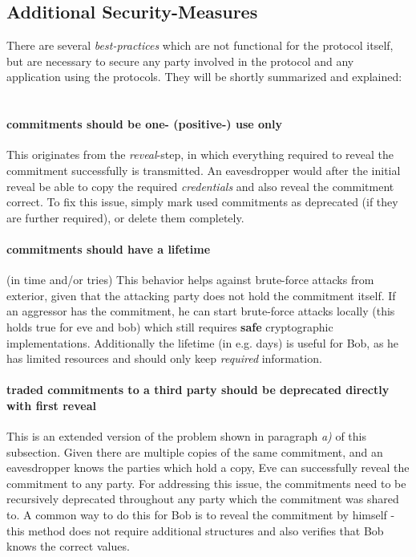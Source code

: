 \documentclass[conference]{IEEEtran}
\begin{document}
\subsection{Additional Security-Measures}
There are several \textit{best-practices} which are not functional for the protocol itself, but are necessary to secure any party involved in the protocol and any application using the protocols. They will be shortly summarized and explained: ~\newline

	\paragraph{commitments should be one- (positive-) use only} This originates from the \textit{reveal}-step, in which everything required to reveal the commitment successfully is transmitted. An eavesdropper would after the initial reveal be able to copy the required \textit{credentials} and also reveal the commitment correct.  To fix this issue, simply mark used commitments as deprecated (if they are further required), or delete them completely. 
	\paragraph{commitments should have a lifetime} (in time and/or tries)
	This behavior helps against brute-force attacks from exterior, given that the attacking party does not hold the commitment itself. If an aggressor has the commitment, he can start brute-force attacks locally (this holds true for eve and bob) which still requires \textbf{safe} cryptographic implementations.
	Additionally the lifetime (in e.g. days) is useful for Bob, as he has limited resources and should only keep \textit{required} information. 
	\paragraph{traded commitments to a third party should be deprecated directly with first reveal} This is an extended version of the problem shown in paragraph \textit{a)} of this subsection. Given there are multiple copies of the same commitment, and an eavesdropper knows the parties which hold a copy, Eve can successfully reveal the commitment to any party. For addressing this issue, the commitments need to be recursively deprecated throughout any party which the commitment was shared to. A common way to do this for Bob is to reveal the commitment by himself - this method does not require additional structures and also verifies that Bob knows the correct values. 
	
\end{document}
